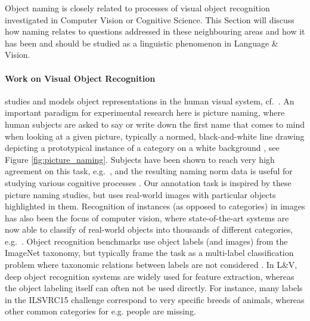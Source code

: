 
Object naming is closely related to processes of visual object recognition investigated in Computer Vision or Cognitive Science.
This Section will discuss how naming relates to questions addressed in these neighbouring areas and how it has been and should be studied as a linguistic phenomenon in Language \& Vision.



\paragraph{Work on Visual Object Recognition} studies and models object representations in the human visual system, cf.\ \cite{regan2000human,rossion2004revisiting}. 
An important paradigm for experimental research here is picture naming, where human subjects are asked to say or write down the first name that comes to mind when looking at a given picture, typically a normed, black-and-white line drawing depicting a prototypical instance of a category on a white background \cite{snodgrass}, see Figure \ref{fig:picture_naming}.
Subjects have been shown to reach very high agreement on this task, e.g.\ \cite{rossion2004revisiting}, and the resulting naming norm data is useful for studying various cognitive processes \cite{humphreys1988cascade}.
Our annotation task is inspired by these picture naming studies, but uses real-world images with particular objects highlighted in them.
Recognition of instances (as opposed to categories) in images has also been the focus of computer vision, where state-of-the-art systems are now able to classify of real-world objects into thousands of different categories, e.g.\  . Object recognition benchmarks use object labels (and images) from the ImageNet \cite{imagenet_cvpr09} taxonomy, but typically frame the task as a multi-label classification problem where taxonomic relations between labels are not considered \cite{ILSVRC15}. 
In L\&V,  deep object recognition systems are widely used for feature extraction, whereas the object labeling itself can often not be used directly. For instance, many labels in the ILSVRC15 challenge correspond to very specific breeds of animals, whereas other common categories  for e.g. people are missing.


